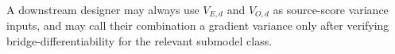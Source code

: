 A downstream designer may always use \(V_{E,d}\) and \(V_{O,d}\) as source-score variance inputs, and may call their combination a gradient variance only after verifying bridge-differentiability for the relevant submodel class.